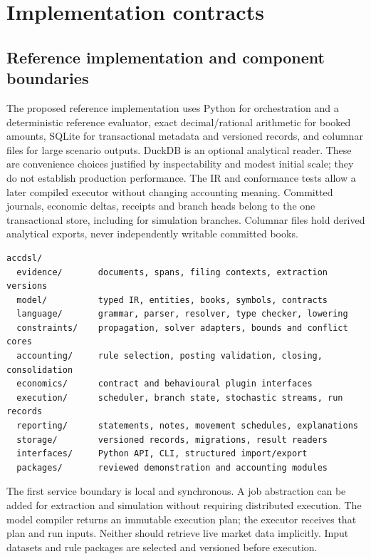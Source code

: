 \chapter{Implementation contracts}
\label{ch:implementation}

\section{Reference implementation and component boundaries}

The proposed reference implementation uses Python for orchestration and a deterministic
reference evaluator, exact decimal/rational arithmetic for booked amounts,
SQLite for transactional metadata and versioned records, and columnar files
for large scenario outputs. DuckDB is an optional analytical reader. These
are convenience choices justified by inspectability and modest initial scale;
they do not establish production performance. The IR and conformance tests
allow a later compiled executor without changing accounting meaning.
Committed journals, economic deltas, receipts and branch heads belong to the
one transactional store, including for simulation branches. Columnar files
hold derived analytical exports, never independently writable committed books.

\begin{lstlisting}
accdsl/
  evidence/       documents, spans, filing contexts, extraction versions
  model/          typed IR, entities, books, symbols, contracts
  language/       grammar, parser, resolver, type checker, lowering
  constraints/    propagation, solver adapters, bounds and conflict cores
  accounting/     rule selection, posting validation, closing, consolidation
  economics/      contract and behavioural plugin interfaces
  execution/      scheduler, branch state, stochastic streams, run records
  reporting/      statements, notes, movement schedules, explanations
  storage/        versioned records, migrations, result readers
  interfaces/     Python API, CLI, structured import/export
  packages/       reviewed demonstration and accounting modules
\end{lstlisting}

The first service boundary is local and synchronous. A job abstraction can be
added for extraction and simulation without requiring distributed execution.
The model compiler returns an immutable execution plan; the executor receives
that plan and run inputs. Neither should retrieve live market data implicitly.
Input datasets and rule packages are selected and versioned before execution.

